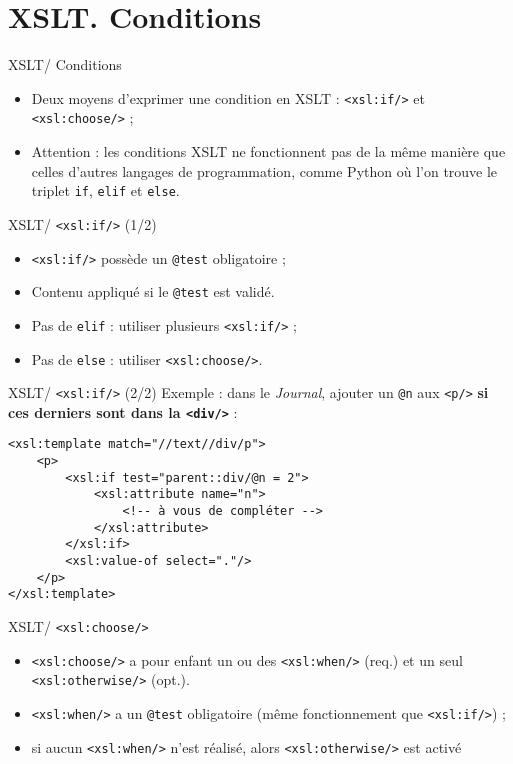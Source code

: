 \documentclass{beamer}
\begin{document}
    \section{XSLT. Conditions}

    \begin{frame}{XSLT/ Conditions}
        \Large
        \begin{itemize}
            \item Deux moyens d'exprimer une condition en XSLT : \texttt{<xsl:if/>} et \texttt{<xsl:choose/>} ;
            \bigskip
            \item Attention : les conditions XSLT ne fonctionnent pas de la même manière que celles d'autres langages de programmation, comme Python où l'on trouve le triplet \texttt{if}, \texttt{elif} et \texttt{else}.
        \end{itemize}
    \end{frame}

    \begin{frame}{XSLT/ \texttt{<xsl:if/>} (1/2)}
        \Large
        \begin{itemize}
            \item \texttt{<xsl:if/>} possède un \texttt{@test} obligatoire ;
            \item Contenu appliqué si le \texttt{@test} est validé.
            \bigskip
            \item Pas de \texttt{elif} : utiliser plusieurs \texttt{<xsl:if/>} ;
            \item Pas de \texttt{else} : utiliser \texttt{<xsl:choose/>}.
        \end{itemize}
    \end{frame}

    \begin{frame}[fragile]{XSLT/ \texttt{<xsl:if/>} (2/2)}
        \Large
        Exemple : dans le \textit{Journal}, ajouter un \texttt{@n} aux \texttt{<p/>} \textbf{si ces derniers sont dans la \texttt{<div/>} } :
        \normalsize
        \begin{verbatim}
<xsl:template match="//text//div/p">
    <p>
        <xsl:if test="parent::div/@n = 2">
            <xsl:attribute name="n">
                <!-- à vous de compléter -->
            </xsl:attribute>
        </xsl:if>
        <xsl:value-of select="."/>
    </p>
</xsl:template>
        \end{verbatim}
    \end{frame}

    \begin{frame}{XSLT/ \texttt{<xsl:choose/>}}
        \Large
        \begin{itemize}
            \item \texttt{<xsl:choose/>} a pour enfant un ou des \texttt{<xsl:when/>} (req.) et un seul \texttt{<xsl:otherwise/>} (opt.).
            \bigskip
            \item \texttt{<xsl:when/>} a un \texttt{@test} obligatoire (même fonctionnement que \texttt{<xsl:if/>}) ;
            \bigskip
            \item si aucun \texttt{<xsl:when/>} n'est réalisé, alors \texttt{<xsl:otherwise/>} est activé
        \end{itemize}
    \end{frame}
\end{document}
